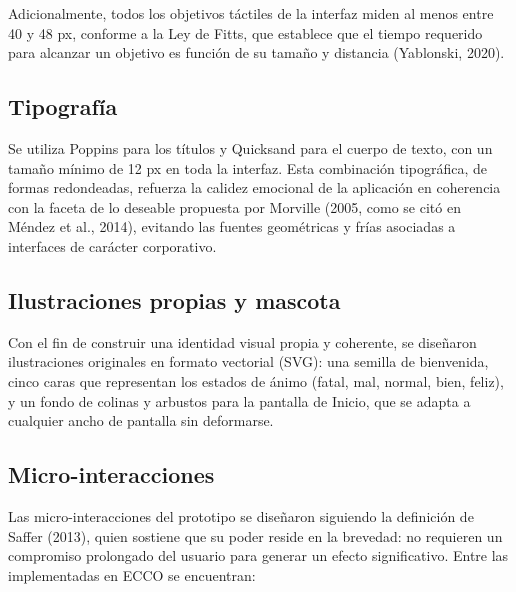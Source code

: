 Adicionalmente, todos los objetivos táctiles de la interfaz miden al menos entre 40 y 48 px, conforme a la Ley de Fitts, que establece que el tiempo requerido para alcanzar un objetivo es función de su tamaño y distancia (Yablonski, 2020).

\subsection{Tipografía}
Se utiliza Poppins para los títulos y Quicksand para el cuerpo de texto, con un tamaño mínimo de 12 px en toda la interfaz. Esta combinación tipográfica, de formas redondeadas, refuerza la calidez emocional de la aplicación en coherencia con la faceta de lo deseable propuesta por Morville (2005, como se citó en Méndez et al., 2014), evitando las fuentes geométricas y frías asociadas a interfaces de carácter corporativo.


\subsection{Ilustraciones propias y mascota}
Con el fin de construir una identidad visual propia y coherente, se diseñaron ilustraciones originales en formato vectorial (SVG): una semilla de bienvenida, cinco caras que representan los estados de ánimo (fatal, mal, normal, bien, feliz), y un fondo de colinas y arbustos para la pantalla de Inicio, que se adapta a cualquier ancho de pantalla sin deformarse.


\subsection{Micro-interacciones}
Las micro-interacciones del prototipo se diseñaron siguiendo la definición de Saffer (2013), quien sostiene que su poder reside en la brevedad: no requieren un compromiso prolongado del usuario para generar un efecto significativo. Entre las implementadas en ECCO se encuentran:

